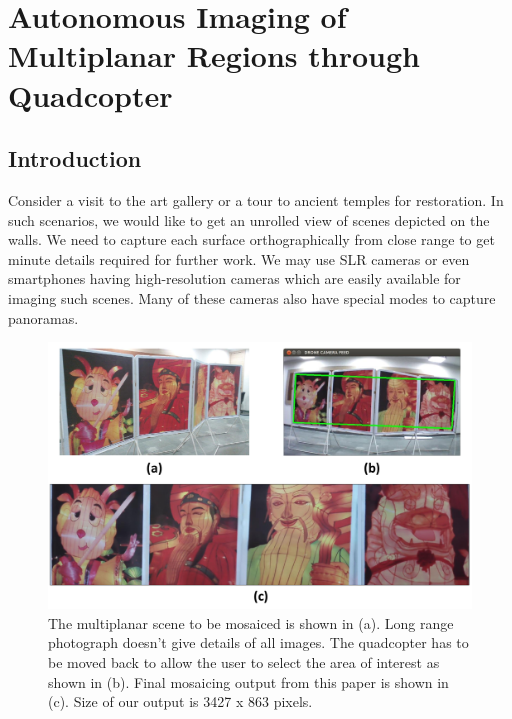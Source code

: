 \chapter[Multiplanar Imaging]{Autonomous Imaging of Multiplanar Regions through
Quadcopter}
\label{ch:multiplanar}
\section{Introduction}
Consider a visit to the art gallery or a tour to ancient temples for restoration. In
such scenarios, we would like to get an unrolled view of scenes depicted on
the walls. We need to capture each surface orthographically from close range to
get minute details required for further work. We may use SLR cameras or even
smartphones having high-resolution cameras which are easily available for
imaging such scenes. Many of these cameras also have special modes to capture
panoramas.
\begin{figure}[h!]
\centering
\includegraphics[width=0.98\linewidth]{figures/multiplanar/teaser2}
\caption[Overview of multiplanar imaging]{The multiplanar scene to be mosaiced
is shown in (a).
Long range photograph doesn't give details of all images. The quadcopter has to be moved back
to allow the user to select the area of interest as shown in (b).
Final mosaicing output from this paper is shown in (c). Size of our output is
3427 x 863 pixels.}
\label{fig:teaser}
\end{figure} 


